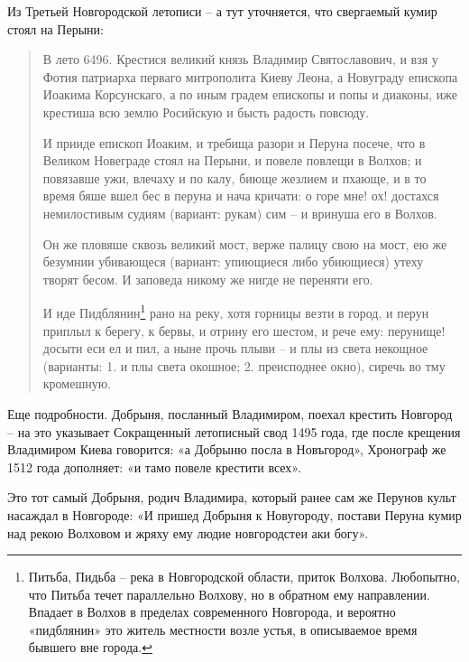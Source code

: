 Из Третьей Новгородской летописи – а тут уточняется, что свергаемый кумир стоял на Перыни:

\begin{quotation}
В лето 6496. Крестися великий князь Владимир Святославович, и взя у Фотия патриарха перваго митрополита Киеву Леона, а Новуграду епископа Иоакима Корсунскаго, а по иным градем епископы и попы и диаконы, иже крестиша всю землю Росийскую и бысть радость повсюду.

И прииде епископ Иоаким, и требища разори и Перуна посече, что в Великом Новеграде стоял на Перыни, и повеле повлещи в Волхов; и повязавше ужи, влечаху и по калу, биюще жезлием и пхающе, и в то время бяше вшел бес в перуна и нача кричати: о горе мне! ох! достахся немилостивым судиям (вариант: рукам) сим – и вринуша его в Волхов. 

Он же пловяше сквозь великий мост, верже палицу свою на мост, ею же безумнии убивающеся (вариант: упиющиеся либо убиющиеся) утеху творят бесом. И заповеда никому же нигде не переняти его.

И иде Пидблянин\footnote{Питьба, Пидьба – река в Новгородской области, приток Волхова. Любопытно, что Питьба течет параллельно Волхову, но в обратном ему направлении. Впадает в Волхов в пределах современного Новгорода, и вероятно «пидблянин» это житель местности возле устья, в описываемое время бывшего вне города.} рано на реку, хотя горницы везти в город, и перун приплыл к берегу, к бервы, и отрину его шестом, и рече ему: перунище! досыти еси ел и пил, а ныне прочь плыви – и плы из света некощное (варианты: 1. и плы света окошное; 2. преисподнее окно), сиречь во тму кромешную. 
\end {quotation}

Еще подробности. Добрыня, посланный Владимиром, поехал крестить Новгород – на это указывает Сокращенный летописный свод 1495 года, где после крещения Владимиром Киева говорится: «а Добрыню посла в Новъгород», Хронограф же 1512 года дополняет: «и тамо повеле крестити всех».

Это тот самый Добрыня, родич Владимира, который ранее сам же Перунов культ насаждал в Новгороде: «И пришед Добрыня к Новугороду, постави Перуна кумир над рекою Волховом и жряху ему людие новгородстеи аки богу».


